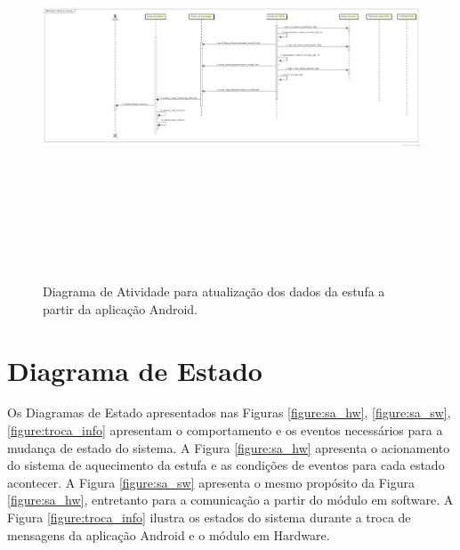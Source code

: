 \documentclass{report}
\begin{document}
	
	\begin{landscape}
	    \begin{figure}[H]
		\includegraphics[width=\linewidth, height = 12cm]{pictures/atualizar_tabela_variaveis.png}
		\caption{Diagrama de Atividade para atualização dos dados da estufa a partir da aplicação Android.}
		\label{figure:atualizar_tabela_variaveis}
	    \end{figure}
	\end{landscape}
	
	
	
   \section{Diagrama de Estado}
  
      Os Diagramas de Estado apresentados nas Figuras {\ref{figure:sa_hw}}, {\ref{figure:sa_sw}}, {\ref{figure:troca_info}} apresentam 
      o comportamento e os eventos necessários para a mudança de estado do sistema. A Figura \ref{figure:sa_hw} apresenta o acionamento
      do sistema de aquecimento da estufa e as condições de eventos para cada estado acontecer. A Figura \ref{figure:sa_sw} apresenta o
      mesmo propósito da Figura \ref{figure:sa_hw}, entretanto para a comunicação a partir do módulo em software. A Figura \ref{figure:troca_info}
      ilustra os estados do sistema durante a troca de mensagens da aplicação Android e o módulo em Hardware. 
  
\end{document}
